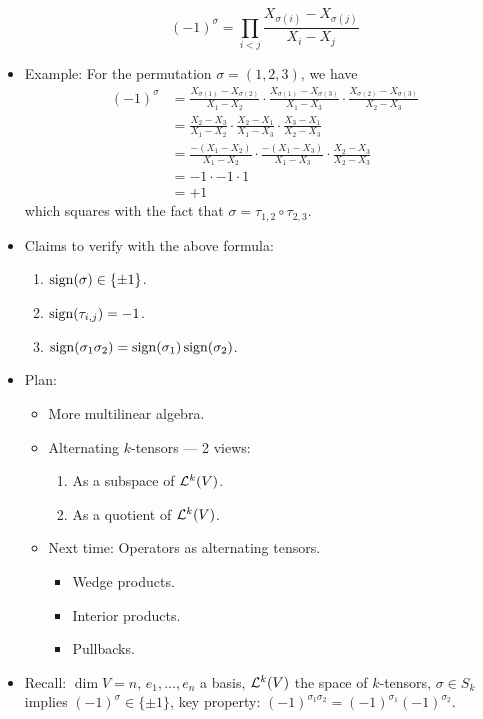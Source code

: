 \documentclass[../notes.tex]{subfiles}
\begin{document}
\begin{itemize}
\begin{equation*}
        (-1)^\sigma = \prod_{i<j}\frac{X_{\sigma(i)}-X_{\sigma(j)}}{X_i-X_j}
    \end{equation*}
    \item Example: For the permutation $\sigma=(1,2,3)$, we have
    \begin{align*}
        (-1)^\sigma &= \frac{X_{\sigma(1)}-X_{\sigma(2)}}{X_1-X_2}\cdot\frac{X_{\sigma(1)}-X_{\sigma(3)}}{X_1-X_3}\cdot\frac{X_{\sigma(2)}-X_{\sigma(3)}}{X_2-X_3}\\
        &= \frac{X_2-X_3}{X_1-X_2}\cdot\frac{X_2-X_1}{X_1-X_3}\cdot\frac{X_3-X_1}{X_2-X_3}\\
        &= \frac{-(X_1-X_2)}{X_1-X_2}\cdot\frac{-(X_1-X_3)}{X_1-X_3}\cdot\frac{X_2-X_3}{X_2-X_3}\\
        &= -1\cdot -1\cdot 1\\
        &= +1
    \end{align*}
    which squares with the fact that $\sigma=\tau_{1,2}\circ\tau_{2,3}$.
    \item Claims to verify with the above formula:
    \begin{enumerate}
        \item $\sgn(\sigma)\in\{\pm 1\}$.
        \item $\sgn(\tau_{i,j})=-1$.
        \item $\sgn(\sigma_1\sigma_2)=\sgn(\sigma_1)\sgn(\sigma_2)$.
    \end{enumerate}
    \item {}Plan:
    \begin{itemize}
        \item More multilinear algebra.
        \item Alternating $k$-tensors --- 2 views:
        \begin{enumerate}
            \item As a subspace of $\lin[k]{V}$.
            \item As a quotient of $\lin[k]{V}$.
        \end{enumerate}
        \item Next time: Operators as alternating tensors.
        \begin{itemize}
            \item Wedge products.
            \item Interior products.
            \item Pullbacks.
        \end{itemize}
    \end{itemize}
    \item Recall: $\dim V=n$, $e_1,\dots,e_n$ a basis, $\lin[k]{V}$ the space of $k$-tensors, $\sigma\in S_k$ implies $(-1)^\sigma\in\{\pm 1\}$, key property: $(-1)^{\sigma_1\sigma_2}=(-1)^{\sigma_1}(-1)^{\sigma_2}$.

\end{itemize}
\end{document}
